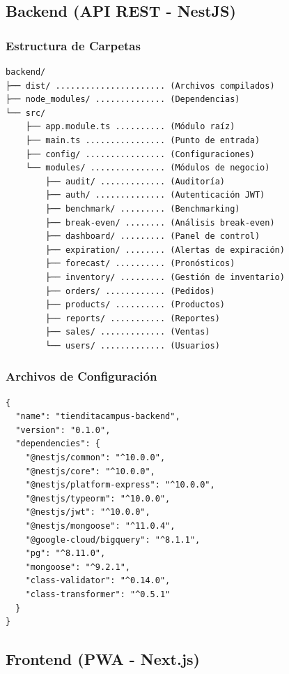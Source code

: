 \documentclass[12pt,a4paper]{article}
\begin{document}
\subsection{Backend (API REST - NestJS)}

\subsubsection{Estructura de Carpetas}

\begin{verbatim}
backend/
├── dist/ ...................... (Archivos compilados)
├── node_modules/ .............. (Dependencias)
└── src/
    ├── app.module.ts .......... (Módulo raíz)
    ├── main.ts ................ (Punto de entrada)
    ├── config/ ................ (Configuraciones)
    └── modules/ ............... (Módulos de negocio)
        ├── audit/ ............. (Auditoría)
        ├── auth/ .............. (Autenticación JWT)
        ├── benchmark/ ......... (Benchmarking)
        ├── break-even/ ........ (Análisis break-even)
        ├── dashboard/ ......... (Panel de control)
        ├── expiration/ ........ (Alertas de expiración)
        ├── forecast/ .......... (Pronósticos)
        ├── inventory/ ......... (Gestión de inventario)
        ├── orders/ ............ (Pedidos)
        ├── products/ .......... (Productos)
        ├── reports/ ........... (Reportes)
        ├── sales/ ............. (Ventas)
        └── users/ ............. (Usuarios)
\end{verbatim}

\subsubsection{Archivos de Configuración}
\begin{lstlisting}[caption=package.json - Dependencias Backend]
{
  "name": "tienditacampus-backend",
  "version": "0.1.0",
  "dependencies": {
    "@nestjs/common": "^10.0.0",
    "@nestjs/core": "^10.0.0",
    "@nestjs/platform-express": "^10.0.0",
    "@nestjs/typeorm": "^10.0.0",
    "@nestjs/jwt": "^10.0.0",
    "@nestjs/mongoose": "^11.0.4",
    "@google-cloud/bigquery": "^8.1.1",
    "pg": "^8.11.0",
    "mongoose": "^9.2.1",
    "class-validator": "^0.14.0",
    "class-transformer": "^0.5.1"
  }
}
\end{lstlisting}

\subsection{Frontend (PWA - Next.js)}
\end{document}
